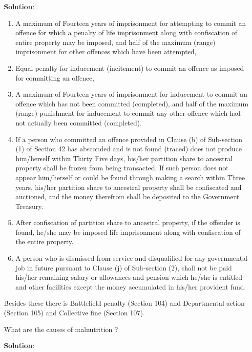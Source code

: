 \documentclass[
  openany]{book}
\newcommand{\question}{\item}
\newenvironment{solution}{ {\bfseries Solution}:}{}
\begin{document}
\begin{questions}
\begin{solution}
\begin{enumerate}
  \begin{enumerate}
    \item A maximum of Fourteen years of imprisonment for attempting to commit an offence for which a penalty of life imprisonment along with confiscation of entire property may be imposed, and half of the maximum (range) imprisonment for other offences which have been attempted,
    \item Equal penalty for inducement (incitement) to commit an offence as imposed for committing an offence,
    \item A maximum of Fourteen years of imprisonment for inducement to commit an offence which has not been committed (completed), and half of the maximum (range) punishment for inducement to commit any other offence which had not actually been committed (completed).
    \item If a person who committed an offence provided in Clause (b) of Sub-section (1) of Section 42 has absconded and is not found (traced) does not produce him/herself within Thirty Five days, his/her partition share to ancestral property shall be frozen from being transacted. If such person does not appear him/herself or could be found through making a search within Three years, his/her partition share to ancestral property shall be confiscated and auctioned, and the money therefrom shall be deposited to the Government Treasury.
    \item After confiscation of partition share to ancestral property, if the  offender is found, he/she may be imposed life imprisonment along with confiscation of the entire property.
    \item A person who is dismissed from service and disqualified for any governmental job in future pursuant to Clause (j) of Sub-section (2), shall not be paid his/her remaining salary or allowances and pension which he/she is entitled and other facilities except the money accumulated in his/her provident fund.
  \end{enumerate}
\end{enumerate}

Besides these there is Battlefield penalty (Section 104) and Departmental action (Section 105) and Collective fine (Section 107).

\end{solution}

\question What are the causes of malnutrition ?

\begin{solution}


\end{solution}
\end{questions}
\end{document}
